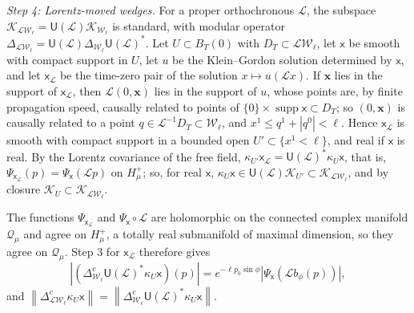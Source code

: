 \documentclass[11pt]{amsart}
\numberwithin{equation}{section}
\theoremstyle{definition}
\newcommand{\sx}{\mathsf x}
\newcommand{\bx}{\mathbf x}
\newcommand{\supp}{\operatorname{supp}}
\newcommand{\norm}[1]{\left\|#1\right\|}
\begin{document}
\smallskip
\emph{Step 4: Lorentz-moved wedges.} For a proper orthochronous
\(\mathcal L\), the subspace
\(\mathcal K_{\mathcal L\mathcal W_\ell}=\mathsf U(\mathcal L)\mathcal K_{\mathcal W_\ell}\)
is standard, with modular operator
\(\Delta_{\mathcal L\mathcal W_\ell}=\mathsf U(\mathcal L)\Delta_{\mathcal W_\ell}\mathsf U(\mathcal L)^*\).
Let \(U\subset B_T(0)\) with \(D_T\subset\mathcal L\mathcal W_\ell\), let
\(\sx\) be smooth with compact support in \(U\), let \(u\) be the
Klein--Gordon solution determined by \(\sx\), and let \(\sx_{\mathcal L}\)
be the time-zero pair of the solution \(x\mapsto u(\mathcal Lx)\). If
\(\bx\) lies in the support of \(\sx_{\mathcal L}\), then \(\mathcal L(0,\bx)\)
lies in the support of \(u\), whose points are, by finite propagation
speed, causally related to points of \(\{0\}\times\supp\sx\subset D_T\); so
\((0,\bx)\) is causally related to a point
\(q\in\mathcal L^{-1}D_T\subset\mathcal W_\ell\), and
\(x^1\le q^1+|q^0|<\ell\). Hence \(\sx_{\mathcal L}\) is smooth with compact
support in a bounded open \(U'\subset\{x^1<\ell\}\), and real if \(\sx\) is
real. By the Lorentz covariance of the free field,
\(\kappa_{U'}\sx_{\mathcal L}=\mathsf U(\mathcal L)^*\kappa_U\sx\), that is,
\(\Psi_{\sx_{\mathcal L}}(p)=\Psi_\sx(\mathcal Lp)\) on \(H_\mu^+\); so, for
real \(\sx\),
\(\kappa_U\sx\in\mathsf U(\mathcal L)\mathcal K_{U'}\subset
\mathcal K_{\mathcal L\mathcal W_\ell}\), and by closure
\(\mathcal K_U\subset\mathcal K_{\mathcal L\mathcal W_\ell}\).

The functions
\(\Psi_{\sx_{\mathcal L}}\) and \(\Psi_\sx\circ\mathcal L\) are holomorphic on
the connected complex manifold \(\mathcal Q_\mu\) and agree on \(H_\mu^+\), a
totally real submanifold of maximal dimension, so they agree on
\(\mathcal Q_\mu\). Step 3 for \(\sx_{\mathcal L}\) therefore gives
\[
 |(\Delta_{\mathcal W_\ell}^{c}\mathsf U(\mathcal L)^*\kappa_U\sx)(p)|
 =e^{-\ell p_0\sin\phi}|\Psi_\sx(\mathcal Lb_\phi(p))|,
\]
and \(\norm{\Delta_{\mathcal L\mathcal W_\ell}^{c}\kappa_U\sx}
=\norm{\Delta_{\mathcal W_\ell}^{c}\mathsf U(\mathcal L)^*\kappa_U\sx}\).
\end{document}
